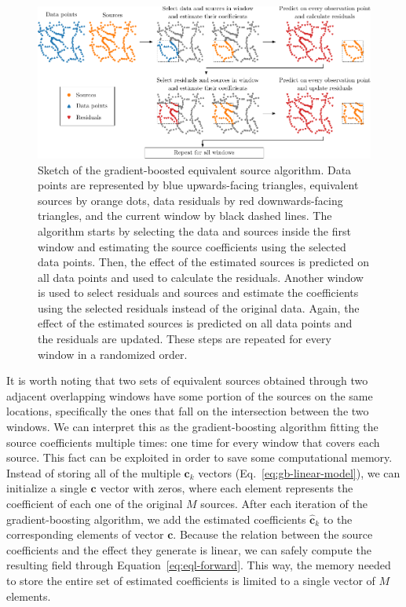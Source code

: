 \begin{figure}
    \centering
    \includegraphics[width=\linewidth]{figs/gradient-boosting-schematics.pdf}
    \caption{
        Sketch of the gradient-boosted equivalent source algorithm.
        Data points are represented by blue upwards-facing triangles,
        equivalent sources by orange dots, data residuals by red downwards-facing
        triangles, and the current window by black dashed lines.
        The algorithm starts by selecting the data and sources
        inside the first window and estimating the source coefficients
        using the selected data points.
        Then, the effect of the estimated sources is predicted on all data
        points and used to calculate the residuals.
        Another window is used to select residuals and sources and
        estimate the coefficients using the selected residuals instead of the
        original data.
        Again, the effect of the estimated sources is predicted on all data points
        and the residuals are updated.
        These steps are repeated for every window in a randomized order.
    }
    \label{fig:gradient-boosting-schematics}
\end{figure}

It is worth noting that two sets of equivalent sources obtained through two
adjacent overlapping windows have some portion of the sources on the same
locations, specifically the ones that fall on the intersection between the two
windows.
We can interpret this as the gradient-boosting algorithm fitting the source
coefficients multiple times: one time for every window that covers each source.
This fact can be exploited in order to save some computational memory.
Instead of storing all of the multiple $\mathbf{c}_k$ vectors
(Eq.~\ref{eq:gb-linear-model}), we can initialize a single $\mathbf{c}$ vector
with zeros, where each element represents the coefficient of each one of the
original $M$ sources.
After each iteration of the gradient-boosting algorithm, we add the estimated
coefficients $\hat{\mathbf{c}}_k$ to the corresponding elements of vector
$\mathbf{c}$.
Because the relation between the source coefficients and the effect they
generate is linear, we can safely compute the resulting field through
Equation~\ref{eq:eql-forward}.
This way, the memory needed to store the entire set of estimated coefficients
is limited to a single vector of $M$ elements.

